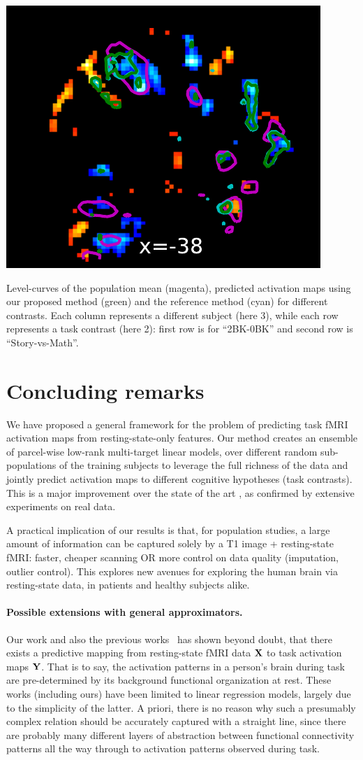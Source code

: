 \begin{pagefigure}
  \hspace{-.2cm}
  \includegraphics[width=.33\linewidth]{figures/brain_STORY-MATH_137633_01bags.pdf}
  \caption{Level-curves of the population mean (magenta), predicted activation
    maps using our proposed method (green) and the reference method \citep{tavor2016task}
    (cyan) for different contrasts. Each column represents a different subject (here 3),
    while each row represents a task contrast (here 2): first row is for ``2BK-0BK'' and second row is ``Story-vs-Math''.}
  \label{fig:zmaps}
\end{pagefigure}
  
\section{Concluding remarks}
We have proposed a general framework for the problem of predicting task fMRI activation maps
from resting-state-only features. Our method creates an ensemble of parcel-wise low-rank multi-target
linear models, over different random sub-populations of the training subjects to leverage
the full richness of the data and jointly predict activation maps to different cognitive hypotheses
(task contrasts). This is a major improvement over the state of the art \citep{tavor2016task},
as confirmed by extensive experiments on real data. 

A practical implication of our results is that, for population
studies, a large amount of information can be captured solely by a T1
image + resting-state fMRI: faster, cheaper scanning OR more control on data quality
(imputation, outlier control). This explores new avenues for exploring
the human brain via resting-state data, in patients and healthy subjects alike.

\paragraph{Possible extensions with general approximators.} Our work and also the previous works~\citep{tavor2016task,cole2016,bzdok2016} has shown beyond doubt, that there exists a predictive mapping from resting-state fMRI data $\mathbf{X}$ to task activation maps $\mathbf{Y}$. That is to say, the activation patterns in a person's brain during task are pre-determined by its background functional organization at rest. These works (including ours) have been limited to linear regression models, largely due to the simplicity of the latter. A priori, there is no reason why such a presumably complex relation should be accurately captured with a straight line, since there are probably many different layers of abstraction between functional connectivity patterns all the way through to activation patterns observed during task.

